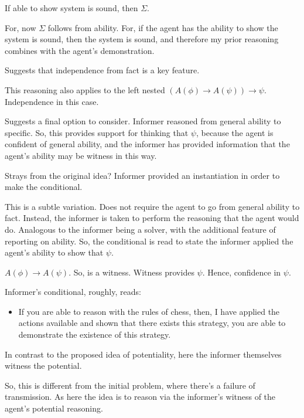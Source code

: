 \documentclass[10pt]{article}
\newcommand{\hozlinedash}[0]{%
  \noindent\hdashrule[0.5ex][c]{\textwidth}{.1pt}{2.5pt}
}
\begin{document}
If able to show system is sound, then \(\Sigma\).

For, now \(\Sigma\) follows from ability.
For, if the agent has the ability to show the system is sound, then the system is sound, and therefore my prior reasoning combines with the agent's demonstration.

Suggests that independence from fact is a key feature.

\hozlinedash

This reasoning also applies to the left nested \((A(\phi) \rightarrow A(\psi)) \rightarrow \psi\).
Independence in this case.

\hozlinedash

Suggests a final option to consider.
Informer reasoned from general ability to specific.
So, this provides support for thinking that \(\psi\), because the agent is confident of general ability, and the informer has provided information that the agent's ability may be witness in this way.

\hozlinedash

Strays from the original idea?
Informer provided an instantiation in order to make the conditional.

This is a subtle variation.
Does not require the agent to go from general ability to fact.
Instead, the informer is taken to perform the reasoning that the agent would do.
Analogous to the informer being a solver, with the additional feature of reporting on ability.
So, the conditional is read to state the informer applied the agent's ability to show that \(\psi\).

\(A(\phi) \rightarrow A(\psi)\).
So, is a witness.
Witness provides \(\psi\).
Hence, confidence in \(\psi\).

Informer's conditional, roughly, reads:

\begin{itemize}
\item If you are able to reason with the rules of chess, then, I have applied the actions available and shown that there exists this strategy, you are able to demonstrate the existence of this strategy.
\end{itemize}

In contrast to the proposed idea of potentiality, here the informer themselves witness the potential.

So, this is different from the initial problem, where there's a failure of transmission.
As here the idea is to reason via the informer's witness of the agent's potential reasoning.
\end{document}
